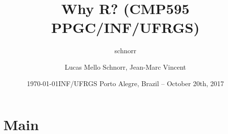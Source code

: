 \documentclass[11pt,xcolor=dvipsnames]{beamer}
\author{schnorr}
\date{\today}
\title{Why R? \linebreak (CMP595 PPGC/INF/UFRGS)}
\begin{document}
{ 

\author{Lucas Mello Schnorr, Jean-Marc Vincent}

\date{INF/UFRGS \newline Porto Alegre, Brazil -- October 20th, 2017}

\maketitle
}

\section{Main}
\end{document}
